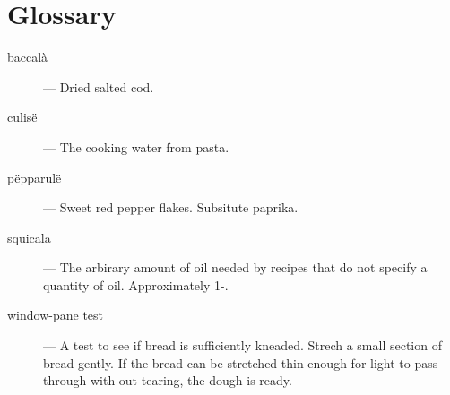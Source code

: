 \documentclass{book}
\begin{document}


\chapter{Glossary}
\begin{description}
\item[baccal\`a] --- Dried salted cod.
\item[culis\"e] --- The cooking water from pasta.
\item[p\"epparul\"e] --- Sweet red pepper flakes. Subsitute paprika.
\item[squicala] --- The arbirary amount of oil needed by recipes that do not specify a quantity of oil. Approximately 1-.
\item[window-pane test] --- A test to see if bread is sufficiently kneaded. Strech a small section of bread gently. If the bread can be stretched thin enough for light to pass through with out tearing, the dough is ready.
\end{description}

\printindex
\end{document}
